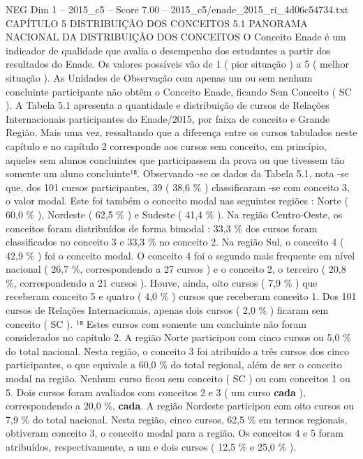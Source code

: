 \begin{textsample}{NEG Dim 1 – 2015\_c5 – Score 7.00 – 2015\_c5/enade\_2015\_ri\_4d06c54734.txt}  \label{ex:f1_neg_346}
CAPÍTULO 5 DISTRIBUIÇÃO DOS CONCEITOS 5.1 PANORAMA NACIONAL DA DISTRIBUIÇÃO DOS CONCEITOS O Conceito Enade é um indicador de qualidade que avalia o desempenho dos estudantes a partir dos resultados do Enade.
Os valores possíveis vão de 1 ( pior situação ) a 5 ( melhor situação ).
As Unidades de Observação com apenas um ou sem nenhum concluinte participante não obtêm o Conceito Enade, ficando Sem Conceito ( SC ).
A Tabela 5.1 apresenta a quantidade e distribuição de cursos de Relações Internacionais participantes do Enade/2015, por faixa de conceito e Grande Região.
Mais uma vez, ressaltando que a diferença entre os cursos tabulados neste capítulo e no capítulo 2 corresponde aos cursos sem conceito, em princípio, aqueles sem alunos concluintes que participassem da prova ou que tivessem tão somente um aluno concluinte¹⁸.
Observando -se os dados da Tabela 5.1, nota -se que, dos 101 cursos participantes, 39 ( 38,6 \% ) classificaram -se com conceito 3, o valor modal.
Este foi também o conceito modal nas seguintes regiões : Norte ( 60,0 \% ), Nordeste ( 62,5 \% ) e Sudeste ( 41,4 \% ).
Na região Centro-Oeste, os conceitos foram distribuídos de forma bimodal : 33,3 \% dos cursos foram classificados no conceito 3 e 33,3 \% no conceito 2.
Na região Sul, o conceito 4 ( 42,9 \% ) foi o conceito modal.
O conceito 4 foi o segundo mais frequente em nível nacional ( 26,7 \%, correspondendo a 27 cursos ) e o conceito 2, o terceiro ( 20,8 \%, correspondendo a 21 cursos ).
Houve, ainda, oito cursos ( 7,9 \% ) que receberam conceito 5 e quatro ( 4,0 \% ) cursos que receberam conceito 1.
Dos 101 cursos de Relações Internacionais, apenas dois cursos ( 2,0 \% ) ficaram sem conceito ( SC ). ¹⁸ Estes cursos com somente um concluinte não foram considerados no capítulo 2.
A região Norte participou com cinco cursos ou 5,0 \% do total nacional.
Nesta região, o conceito 3 foi atribuído a três cursos dos cinco participantes, o que equivale a 60,0 \% do total regional, além de ser o conceito modal na região.
Nenhum curso ficou sem conceito ( SC ) ou com conceitos 1 ou 5.
Dois cursos foram avaliados com conceitos 2 e 3 ( um curso \textbf{cada} ), correspondendo a 20,0 \%, \textbf{cada}.
A região Nordeste participou com oito cursos ou 7,9 \% do total nacional.
Nesta região, cinco cursos, 62,5 \% em termos regionais, obtiveram conceito 3, o conceito modal para a região.
Os conceitos 4 e 5 foram atribuídos, respectivamente, a um e dois cursos ( 12,5 \% e 25,0 \% ).

\end{textsample}
